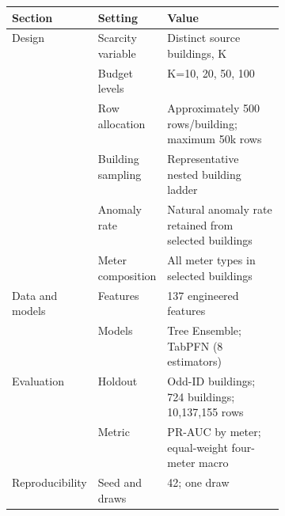 \documentclass[10pt]{article}
\begin{document}
\begin{preview}\begin{minipage}{\linewidth}
\centering
{}
\label{tab:m5-exp-b-setup}
\begin{tabularx}{\linewidth}{p{0.17\linewidth}p{0.23\linewidth}X}
\toprule
Section & Setting & Value \\
\midrule
Design & Scarcity variable & Distinct source buildings, K \\
 & Budget levels & K=10, 20, 50, 100 \\
 & Row allocation & Approximately 500 rows/building; maximum 50k rows \\
 & Building sampling & Representative nested building ladder \\
 & Anomaly rate & Natural anomaly rate retained from selected buildings \\
 & Meter composition & All meter types in selected buildings \\
\addlinespace[2pt]
Data and models & Features & 137 engineered features \\
 & Models & Tree Ensemble; TabPFN (8 estimators) \\
\addlinespace[2pt]
Evaluation & Holdout & Odd-ID buildings; 724 buildings; 10,137,155 rows \\
 & Metric & PR-AUC by meter; equal-weight four-meter macro \\
\addlinespace[2pt]
Reproducibility & Seed and draws & 42; one draw \\
\bottomrule
\end{tabularx}
\end{minipage}\end{preview}
\end{document}
